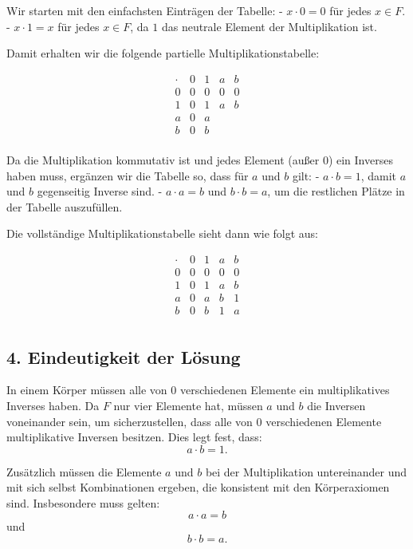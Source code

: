 \documentclass[11pt]{article}
\begin{document}
Wir starten mit den einfachsten Einträgen der Tabelle:
- \( x \cdot 0 = 0 \) für jedes \( x \in F \).
- \( x \cdot 1 = x \) für jedes \( x \in F \), da \( 1 \) das neutrale Element der Multiplikation ist.

Damit erhalten wir die folgende partielle Multiplikationstabelle:

\[
\begin{array}{c|cccc}
    \cdot & 0 & 1 & a & b \\
    \hline
    0 & 0 & 0 & 0 & 0 \\
    1 & 0 & 1 & a & b \\
    a & 0 & a &  &  \\
    b & 0 & b &  &  \\
\end{array}
\]

Da die Multiplikation kommutativ ist und jedes Element (außer \( 0 \)) ein Inverses haben muss, ergänzen wir die Tabelle so, dass für \( a \) und \( b \) gilt:
- \( a \cdot b = 1 \), damit \( a \) und \( b \) gegenseitig Inverse sind.
- \( a \cdot a = b \) und \( b \cdot b = a \), um die restlichen Plätze in der Tabelle auszufüllen.

Die vollständige Multiplikationstabelle sieht dann wie folgt aus:

\[
\begin{array}{c|cccc}
    \cdot & 0 & 1 & a & b \\
    \hline
    0 & 0 & 0 & 0 & 0 \\
    1 & 0 & 1 & a & b \\
    a & 0 & a & b & 1 \\
    b & 0 & b & 1 & a \\
\end{array}
\]

\subsection*{4. Eindeutigkeit der Lösung}

In einem Körper müssen alle von \( 0 \) verschiedenen Elemente ein multiplikatives Inverses haben. Da \( F \) nur vier Elemente hat, müssen \( a \) und \( b \) die Inversen voneinander sein, um sicherzustellen, dass alle von \( 0 \) verschiedenen Elemente multiplikative Inversen besitzen. Dies legt fest, dass:
\[
a \cdot b = 1.
\]

Zusätzlich müssen die Elemente \( a \) und \( b \) bei der Multiplikation untereinander und mit sich selbst Kombinationen ergeben, die konsistent mit den Körperaxiomen sind. Insbesondere muss gelten:
\[
a \cdot a = b
\]
und
\[
b \cdot b = a.
\]





\end{document}
